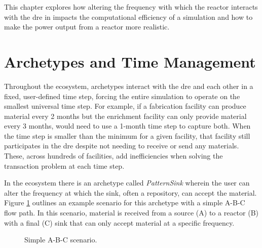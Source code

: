 This chapter explores how altering the frequency with which the \cycamore reactor interacts with the \gls{dre} in \cyclus impacts the computational efficiency of a simulation and how to make the power output from a reactor more realistic.

\section{Archetypes and Time Management}
\label{sec:archetypes_and_time_management}

Throughout the \cyclus ecosystem, archetypes interact with the \gls{dre} and
each other in a fixed, user-defined time step, forcing the entire simulation
to operate on the smallest universal time step. For example, if a fabrication
facility can produce material every 2 months but the enrichment facility can
only provide material every 3 months, \cyclus would need to use a 1-month time step to capture both. When the time step is smaller than the minimum for a given
facility, that facility still participates in the \gls{dre} despite not needing to receive or send any materials. These, across hundreds of facilities, add inefficiencies when solving the transaction problem at each time step.

In the \cyclus ecosystem there is an archetype called \textit{PatternSink} wherein the user can alter the frequency at which the sink, often a repository, can accept the material. Figure \ref{fig:a-b-c} outlines an example scenario for this archetype with a simple A-B-C flow path. In this scenario, material is received from a source (A) to a reactor (B) with a final (C) sink that can only accept material at a specific frequency.

\begin{figure}[H]
    \centering
    \caption{Simple A-B-C scenario.}
    \label{fig:a-b-c}
\end{figure}


